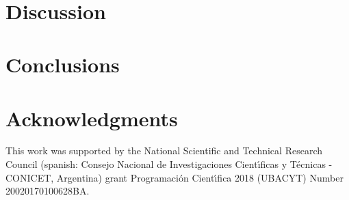 \documentclass[preprint,12pt]{elsarticle}
\begin{document}
\begin{figure}[!htbp]
\centering
    \ 
    \\
\caption[width=0.47\columnwidth]{}
\label{flow_density}
\end{figure}

\section{\label{discussion}Discussion}



\section{\label{conclusions}Conclusions}

\section*{Acknowledgments}
This work was supported by the National Scientific and Technical 
Research Council (spanish: Consejo Nacional de Investigaciones Cient\'\i ficas 
y T\'ecnicas - CONICET, Argentina) grant Programaci\'on Cient\'\i fica 2018 (UBACYT) Number 20020170100628BA.

\appendix
\end{document}
